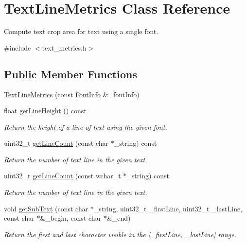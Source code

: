 \hypertarget{class_text_line_metrics}{\section{Text\+Line\+Metrics Class Reference}
\label{class_text_line_metrics}
}


Compute text crop area for text using a single font.  




{\ttfamily \#include $<$text\+\_\+metrics.\+h$>$}

\subsection*{Public Member Functions}
\begin{DoxyCompactItemize}
\item 
\hyperlink{class_text_line_metrics_af14bb35a3a80f34f1740ed115ba59f1f}{Text\+Line\+Metrics} (const \hyperlink{struct_font_info}{Font\+Info} \&\+\_\+font\+Info)
\item 
float \hyperlink{class_text_line_metrics_a9d511622738445c25e74832d046d13f9}{get\+Line\+Height} () const 
\begin{DoxyCompactList}\small\item\em Return the height of a line of text using the given font. \end{DoxyCompactList}\item 
uint32\+\_\+t \hyperlink{class_text_line_metrics_a9dfe782d495b151f7af1da068e950221}{get\+Line\+Count} (const char $\ast$\+\_\+string) const 
\begin{DoxyCompactList}\small\item\em Return the number of text line in the given text. \end{DoxyCompactList}\item 
uint32\+\_\+t \hyperlink{class_text_line_metrics_ad637dd57c23020dc2602e63a5c917b62}{get\+Line\+Count} (const wchar\+\_\+t $\ast$\+\_\+string) const 
\begin{DoxyCompactList}\small\item\em Return the number of text line in the given text. \end{DoxyCompactList}\item 
void \hyperlink{class_text_line_metrics_ab493b5277c00b2fe780c99e7d9a354bf}{get\+Sub\+Text} (const char $\ast$\+\_\+string, uint32\+\_\+t \+\_\+first\+Line, uint32\+\_\+t \+\_\+last\+Line, const char $\ast$\&\+\_\+begin, const char $\ast$\&\+\_\+end)
\begin{DoxyCompactList}\small\item\em Return the first and last character visible in the \mbox{[}\+\_\+first\+Line, \+\_\+last\+Line\mbox{]} range. \end{DoxyCompactList}\item 

\end{DoxyCompactItemize}
